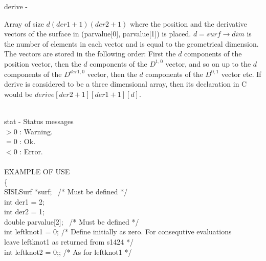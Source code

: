         \>\>    {\fov derive}\> - \>    \begin{minipg2}
                                Array of size $d(der1+1)(der2+1)$
                                where the position and the derivative
                                vectors of the surface in
                                ({\fov parvalue}[0], {\fov parvalue}[1]) is placed.
                                $d=surf\rightarrow dim$ is the number of
                                elements in each vector and is equal to
                                the geometrical dimension.
                       The vectors are stored in the following order:
                       First the $d$ components of the position vector,
                       then the $d$ components of the $D^{1,0}$ vector,
                       and so on up to the $d$ components of the $D^{der1,0}$
                       vector,
                       then the $d$ components of the $D^{0,1}$ vector etc.
                       If derive is considered to be a
                       three dimensional array, then its declaration in C
                       would be $derive[der2+1][der1+1][d]$.
                                \end{minipg2}\\[0.3ex]
        \>\>    {\fov stat}     \> - \> Status messages\\
                \>\>\>\>\>      $> 0$ : \>      Warning.\\
                \>\>\>\>\>      $= 0$ : \>      Ok.\\
                \>\>\>\>\>      $< 0$ : \>      Error.\\
\\
EXAMPLE OF USE\\
                \>      \{ \\
                \>\>    SISLSurf        \>      *{\fov surf}; \, /* Must be defined */\\
                \>\>    int     \>      {\fov der1} = 2;\\
                \>\>    int     \>      {\fov der2} = 1;\\
                \>\>    double  \>      {\fov parvalue}[2]; \, /* Must be defined */\\
                \>\>    int     \>      {\fov leftknot1} = 0; /* Define initially as zero. For consequtive evaluations \\
                \>\>\>\>\>\> leave leftknot1 as returned from s1424 */\\
                \>\>    int     \>      {\fov leftknot2} = 0;; /* As for leftknot1 */ \\
